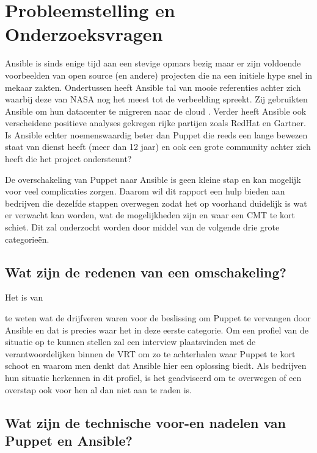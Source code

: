 \section{Probleemstelling en Onderzoeksvragen}
\label{sec:onderzoeksvragen}

Ansible is sinds enige tijd aan een stevige opmars bezig maar er zijn voldoende voorbeelden van open source (en andere) projecten die na een initiele hype snel in mekaar zakten. Ondertussen heeft Ansible tal van mooie referenties achter zich waarbij deze van NASA nog het meest tot de verbeelding spreekt. Zij gebruikten Ansible om hun datacenter te migreren naar de cloud \autocite{nacasestudy}.  Verder heeft Ansible ook verscheidene positieve analyses gekregen rijke partijen zoals RedHat en Gartner. Is Ansible echter noemenswaardig beter dan Puppet die reeds een lange bewezen staat van dienst heeft (meer dan 12 jaar) en ook een grote community achter zich heeft die het project ondersteunt?

De overschakeling van Puppet naar Ansible is geen kleine stap en kan mogelijk voor veel complicaties zorgen. Daarom wil dit rapport een hulp bieden aan bedrijven die dezelfde stappen overwegen zodat het op voorhand duidelijk is wat er verwacht kan worden, wat de mogelijkheden zijn en waar een \gls{CMT} te kort schiet. Dit zal onderzocht worden door middel van de volgende drie grote categorie\"en. 


\subsection{Wat zijn de redenen van een omschakeling?}

Het is van 


 te weten wat de drijfveren waren voor de beslissing om Puppet te vervangen door Ansible en dat is precies waar het in deze eerste categorie. Om een profiel van de situatie op te kunnen stellen zal een interview plaatsvinden met de verantwoordelijken binnen de VRT om zo te achterhalen waar Puppet te kort schoot en waarom men denkt dat Ansible hier een oplossing biedt. Als bedrijven hun situatie herkennen in dit profiel, is het geadviseerd om te overwegen of een overstap ook voor hen al dan niet aan te raden is.

\subsection{Wat zijn de technische voor-en nadelen van Puppet en Ansible?}

